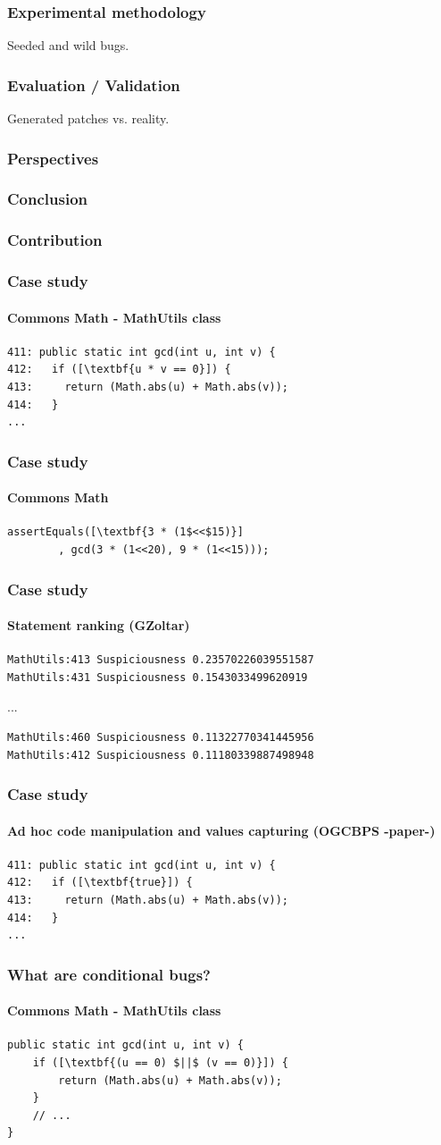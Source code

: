 \documentclass{beamer}
\begin{document}
  \frame
  {
    \frametitle{Experimental methodology}
    Seeded and wild bugs.
  }
  
  \frame
  {
    \frametitle{Evaluation / Validation}
    Generated patches vs. reality.
  }
  
  \frame
  {
    \frametitle{Perspectives}
    
  }
  
  \frame
  {
    \frametitle{Conclusion}
    
  }

  \frame
  {
    \frametitle{Contribution}
    
  }
  
 \begin{frame}[fragile]
    \frametitle{Case study}
      \framesubtitle{Commons Math - MathUtils class}
\begin{lstlisting}[escapeinside=\[\]]
411: public static int gcd(int u, int v) {
412:   if ([\textbf{u * v == 0}]) {
413:     return (Math.abs(u) + Math.abs(v));
414:   }
...
\end{lstlisting}
\end{frame}

 \begin{frame}[fragile]
    \frametitle{Case study}
      \framesubtitle{Commons Math}
        \begin{lstlisting}[escapeinside=\[\]]
assertEquals([\textbf{3 * (1$<<$15)}]
        , gcd(3 * (1<<20), 9 * (1<<15)));
	\end{lstlisting}
\end{frame}

 \begin{frame}[fragile]
    \frametitle{Case study}
      \framesubtitle{Statement ranking (GZoltar)}
\begin{verbatim}
MathUtils:413 Suspiciousness 0.23570226039551587
MathUtils:431 Suspiciousness 0.1543033499620919
\end{verbatim}
...
\begin{verbatim}
MathUtils:460 Suspiciousness 0.11322770341445956
MathUtils:412 Suspiciousness 0.11180339887498948
\end{verbatim}
\end{frame}

 \begin{frame}[fragile]
    \frametitle{Case study}
      \framesubtitle{Ad hoc code manipulation and values capturing (OGCBPS -paper-)}
\begin{lstlisting}[escapeinside=\[\]]
411: public static int gcd(int u, int v) {
412:   if ([\textbf{true}]) {
413:     return (Math.abs(u) + Math.abs(v));
414:   }
...
\end{lstlisting}
\end{frame}

 \begin{frame}[fragile]
    \frametitle{What are conditional bugs?}
    \framesubtitle{Commons Math - MathUtils class}
        \begin{lstlisting}[escapeinside=\[\]]
public static int gcd(int u, int v) {
    if ([\textbf{(u == 0) $||$ (v == 0)}]) {
        return (Math.abs(u) + Math.abs(v));
    }
    // ...
}
	\end{lstlisting}
\end{frame}
\end{document}
